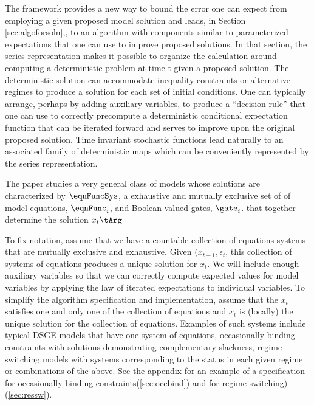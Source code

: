 \documentclass[12pt]{article}
\begin{document}
The framework provides a new way to bound the error one can expect from
employing a given proposed model solution and leads, in Section \ref{sec:algoforsoln},, to an
algorithm with  components similar to parameterized expectations that
one can use to improve proposed solutions. In that section, the
series representation makes
it possible to organize the calculation around computing a deterministic
problem at time t given a proposed solution.  The deterministic solution
can accommodate inequality constraints or alternative regimes to produce a
solution for each set of initial conditions.  One can typically arrange,
perhaps by adding auxiliary variables, to produce a ``decision rule''
that one can use to correctly precompute a deterministic conditional
expectation function that can be iterated forward and serves to
improve upon the original proposed solution.
Time invariant stochastic functions 
lead naturally to an associated family of deterministic maps
which can be conveniently represented by the series representation.


The paper studies a very general class of models whose 
solutions are characterized by $\eqnFuncSys$, a 
 exhaustive and mutually exclusive set of
of   model equations, $\eqnFunc_i$,  and Boolean valued gates, $\gate_i$. 
that together determine the solution  $x_t\tArg$




To fix notation,  assume that we have a countable collection of equations systems that are mutually exclusive and exhaustive.
Given $(x_{t-1},\epsilon_t$,  this collection of 
systems of equations produces a unique solution for $x_t$.  We will include 
enough auxiliary variables so that we can correctly compute expected values
for model variables by applying the law of iterated 
expectations to individual variables.
To simplify the algorithm specification and implementation, assume that the
$x_t$ satisfies one and only one of the 
collection of equations and $x_t$ is (locally) the unique solution 
for the collection of
equations.  Examples of such systems include typical DSGE models that have one
system of equations, occasionally binding constraints with solutions demonstrating complementary slackness, regime switching models with systems corresponding to the status in each given regime or combinations of the above.  See the appendix for an example of a specification for occasionally binding constraints(\ref{sec:occbind}) and for regime switching)(\ref{sec:ressw}).
\end{document}
